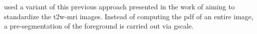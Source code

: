 \begin{enumerate}[leftmargin=*]

\cite{Viswanath2009,Viswanath2011,Viswanath2012} used a variant of this previous approach presented in the work of \cite{Madabhushi2006a} aiming to standardize the \ac{t2w}-\ac{mri} images. Instead of computing the \ac{pdf} of an entire image, a pre-segmentation of the foreground is carried out via \ac{gscale}.%


\end{enumerate}
